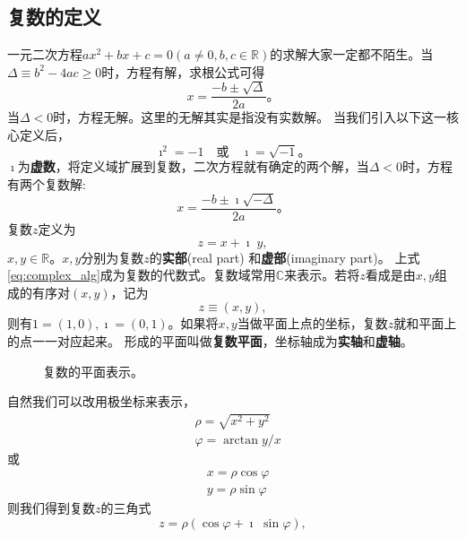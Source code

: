 


\subsection{复数的定义}
一元二次方程$a x^2 + b x + c = 0 (a\neq 0, b,c \in \mathbb{R})$的求解大家一定都不陌生。当$\Delta \equiv b^2 - 4 a c \geq 0$时，方程有解，求根公式可得
\begin{equation}
    x = \frac{-b \pm \sqrt{\Delta}}{2a} \textrm{。}
\end{equation}
当$\Delta < 0$时，方程无解。这里的无解其实是指没有实数解。
当我们引入以下这一核心定义后，
\begin{equation}
    \imath ^2 = -1 \quad \textrm{或} \quad \imath = \sqrt{-1} \textrm{。} 
\end{equation}
$\imath$为{\bf 虚数}，将定义域扩展到复数，二次方程就有确定的两个解，当$\Delta < 0$时，方程有两个复数解:
\begin{equation}
    x = \frac{-b \pm \imath \sqrt{-\Delta}}{2a} \textrm{。}
\end{equation}
复数$z$定义为
\begin{equation}
    \label{eq:complex_alg}
    z = x + \imath \; y ,
\end{equation}
$x,y \in {\mathbb{R}}$。$x,y$分别为复数$z$的{\bf 实部}(real part) 和{\bf 虚部}(imaginary part)。
上式\eqref{eq:complex_alg}成为复数的代数式。复数域常用$\mathbb{C}$来表示。若将$z$看成是由$x,y$组成的有序对$(x,y)$，记为
\begin{equation}
    z \equiv (x,y),
\end{equation}
则有$1 = (1,0), \imath = (0, 1)$。如果将$x,y$当做平面上点的坐标，复数$z$就和平面上的点一一对应起来。
形成的平面叫做{\bf 复数平面}，坐标轴成为{\bf 实轴}和{\bf 虚轴}。
\begin{figure}[htb]
    \centering
    
  \caption{复数的平面表示。} \label{fig:complex_plane}
\end{figure} 
自然我们可以改用极坐标来表示，
\begin{align}
    & \rho = \sqrt{x^2 + y^2}\\
    & \varphi = \arctan y/x
\end{align}
或
\begin{align}
    & x = \rho \cos\varphi \\
    & y = \rho \sin\varphi 
\end{align}
则我们得到复数$z$的三角式
\begin{equation}
    z = \rho (\cos\varphi +  \imath\; \sin\varphi) ,
\end{equation}
